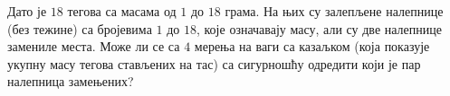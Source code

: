 Дато је $18$ тегова са масама од $1$ до $18$ грама.
На њих су залепљене налепнице (без тежине) са бројевима $1$ до $18$, које
означавају масу, али су две налепнице замениле места.
Може ли се са $4$ мерења на ваги са казаљком (која показује укупну масу тегова
стављених на тас) са сигурношћу одредити који је пар налепница замењених?

\solution

